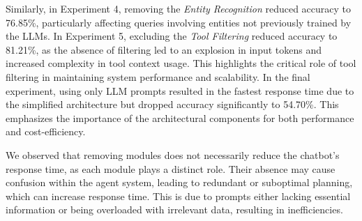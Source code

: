 \documentclass[runningheads]{llncs}
\begin{document}
Similarly, in Experiment 4, removing the \textit{Entity Recognition} reduced accuracy to 76.85\%, particularly affecting queries involving entities not previously trained by the LLMs. In Experiment 5, excluding the \textit{Tool Filtering} reduced accuracy to 81.21\%, as the absence of filtering led to an explosion in input tokens and increased complexity in tool context usage. This highlights the critical role of tool filtering in maintaining system performance and scalability. In the final experiment, using only LLM prompts resulted in the fastest response time due to the simplified architecture but dropped accuracy significantly to  54.70\%. This emphasizes the importance of the architectural components for both performance and cost-efficiency. %

We observed that removing modules does not necessarily reduce the chatbot's response time, as each module plays a distinct role. Their absence may cause confusion within the agent system, leading to redundant or suboptimal planning, which can increase response time. This is due to prompts either lacking essential information or being overloaded with irrelevant data, resulting in inefficiencies.
\end{document}
